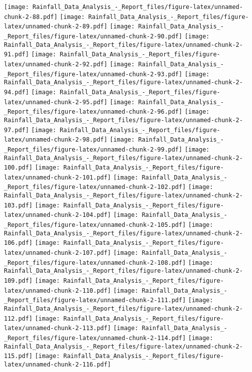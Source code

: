 \documentclass[
]{article}
\begin{document}
\texttt{[image: Rainfall\_Data\_Analysis\_-\_Report\_files/figure-latex/unnamed-chunk-2-88.pdf]}
\texttt{[image: Rainfall\_Data\_Analysis\_-\_Report\_files/figure-latex/unnamed-chunk-2-89.pdf]}
\texttt{[image: Rainfall\_Data\_Analysis\_-\_Report\_files/figure-latex/unnamed-chunk-2-90.pdf]}
\texttt{[image: Rainfall\_Data\_Analysis\_-\_Report\_files/figure-latex/unnamed-chunk-2-91.pdf]}
\texttt{[image: Rainfall\_Data\_Analysis\_-\_Report\_files/figure-latex/unnamed-chunk-2-92.pdf]}
\texttt{[image: Rainfall\_Data\_Analysis\_-\_Report\_files/figure-latex/unnamed-chunk-2-93.pdf]}
\texttt{[image: Rainfall\_Data\_Analysis\_-\_Report\_files/figure-latex/unnamed-chunk-2-94.pdf]}
\texttt{[image: Rainfall\_Data\_Analysis\_-\_Report\_files/figure-latex/unnamed-chunk-2-95.pdf]}
\texttt{[image: Rainfall\_Data\_Analysis\_-\_Report\_files/figure-latex/unnamed-chunk-2-96.pdf]}
\texttt{[image: Rainfall\_Data\_Analysis\_-\_Report\_files/figure-latex/unnamed-chunk-2-97.pdf]}
\texttt{[image: Rainfall\_Data\_Analysis\_-\_Report\_files/figure-latex/unnamed-chunk-2-98.pdf]}
\texttt{[image: Rainfall\_Data\_Analysis\_-\_Report\_files/figure-latex/unnamed-chunk-2-99.pdf]}
\texttt{[image: Rainfall\_Data\_Analysis\_-\_Report\_files/figure-latex/unnamed-chunk-2-100.pdf]}
\texttt{[image: Rainfall\_Data\_Analysis\_-\_Report\_files/figure-latex/unnamed-chunk-2-101.pdf]}
\texttt{[image: Rainfall\_Data\_Analysis\_-\_Report\_files/figure-latex/unnamed-chunk-2-102.pdf]}
\texttt{[image: Rainfall\_Data\_Analysis\_-\_Report\_files/figure-latex/unnamed-chunk-2-103.pdf]}
\texttt{[image: Rainfall\_Data\_Analysis\_-\_Report\_files/figure-latex/unnamed-chunk-2-104.pdf]}
\texttt{[image: Rainfall\_Data\_Analysis\_-\_Report\_files/figure-latex/unnamed-chunk-2-105.pdf]}
\texttt{[image: Rainfall\_Data\_Analysis\_-\_Report\_files/figure-latex/unnamed-chunk-2-106.pdf]}
\texttt{[image: Rainfall\_Data\_Analysis\_-\_Report\_files/figure-latex/unnamed-chunk-2-107.pdf]}
\texttt{[image: Rainfall\_Data\_Analysis\_-\_Report\_files/figure-latex/unnamed-chunk-2-108.pdf]}
\texttt{[image: Rainfall\_Data\_Analysis\_-\_Report\_files/figure-latex/unnamed-chunk-2-109.pdf]}
\texttt{[image: Rainfall\_Data\_Analysis\_-\_Report\_files/figure-latex/unnamed-chunk-2-110.pdf]}
\texttt{[image: Rainfall\_Data\_Analysis\_-\_Report\_files/figure-latex/unnamed-chunk-2-111.pdf]}
\texttt{[image: Rainfall\_Data\_Analysis\_-\_Report\_files/figure-latex/unnamed-chunk-2-112.pdf]}
\texttt{[image: Rainfall\_Data\_Analysis\_-\_Report\_files/figure-latex/unnamed-chunk-2-113.pdf]}
\texttt{[image: Rainfall\_Data\_Analysis\_-\_Report\_files/figure-latex/unnamed-chunk-2-114.pdf]}
\texttt{[image: Rainfall\_Data\_Analysis\_-\_Report\_files/figure-latex/unnamed-chunk-2-115.pdf]}
\texttt{[image: Rainfall\_Data\_Analysis\_-\_Report\_files/figure-latex/unnamed-chunk-2-116.pdf]}
\end{document}
